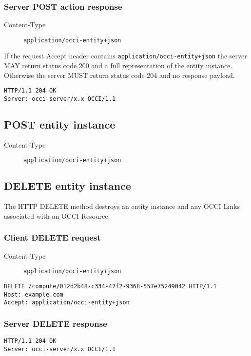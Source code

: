 \documentclass[10pt,a4paper]{article}
\begin{document}
\subsubsection{Server POST action response}
\begin{description}
\item[Content-Type] {\tt application/occi-entity+json}
\end{description}
If the request Accept header contains {\tt application/occi-entity+json} the
server MAY return status code 200 and a full representation of the entity instance.
Otherwise the server MUST return status code 204 and no response payload.
\begin{verbatim}
HTTP/1.1 204 OK
Server: occi-server/x.x OCCI/1.1
\end{verbatim}

\subsection{POST entity instance}
\begin{description}
\item[Content-Type] {\tt application/occi-entity+json}
\end{description}

\subsection{DELETE entity instance}
The HTTP DELETE method destroys an entity instance and any OCCI Links
associated with an OCCI Resource.

\subsubsection{Client DELETE request}
\begin{description}
\item[Content-Type] {\tt application/occi-entity+json}
\end{description}
\begin{verbatim}
DELETE /compute/012d2b48-c334-47f2-9368-557e75249042 HTTP/1.1
Host: example.com
Accept: application/occi-entity+json
\end{verbatim}

\subsubsection{Server DELETE response}
\begin{verbatim}
HTTP/1.1 204 OK
Server: occi-server/x.x OCCI/1.1
\end{verbatim}
\end{document}
